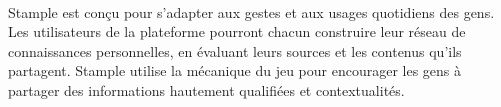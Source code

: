 \documentclass[12pt,oneside,a4paper]{article}
\begin{document}
\paragraph{}
Stample est conçu pour s'adapter aux gestes et aux usages quotidiens des gens. Les utilisateurs de la plateforme pourront chacun construire leur réseau de connaissances personnelles, en évaluant leurs sources et les contenus qu'ils partagent.
Stample utilise la mécanique du jeu pour encourager les gens à partager des informations hautement qualifiées et contextualités.
\end{document}
